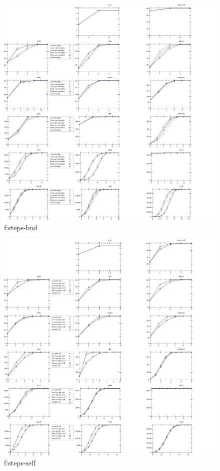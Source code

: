 \begin{figure}[t]
  \includegraphics[width=\textwidth]{data/cdf-steps_boundary.pdf}
  \caption{f:steps-bnd}
  \label{f:steps-bnd}
\end{figure}

\begin{figure}[t]
  \includegraphics[width=\textwidth]{data/cdf-steps_prf_self.pdf}
  \caption{f:steps-self}
  \label{f:steps-self}
\end{figure}

